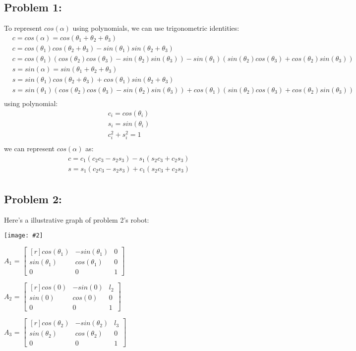 \documentclass[11pt]{article}
\newcommand{\image}[2]{\texttt{[image: \#2]}}
\newcommand{\mat}[1]{
    $\begin{bmatrix*}[r]
        #1
    \end{bmatrix*}$
} %
\newcommand{\myalign}[1]{\begin{align*}#1\end{align*}}
\begin{document}
\subsection{Problem 1:}
To represent $cos(\alpha)$ using  polynomials, we can use trigonometric identities:
\myalign{
    & c = cos(\alpha) = cos(\theta_1 +\theta_2 + \theta_3) \\
    & c = cos(\theta_1)cos(\theta_2+\theta_3)-sin(\theta_1)sin(\theta_2+\theta_3) \\
    & c = cos(\theta_1)(cos(\theta_2)cos(\theta_3)-sin(\theta_2)sin(\theta_3))-sin(\theta_1)(sin(\theta_2)cos(\theta_3)+cos(\theta_2)sin(\theta_3)) \\
    & s = sin(\alpha) = sin(\theta_1 + \theta_2 + \theta_3) \\
    & s = sin(\theta_1)cos(\theta_2+\theta_3)+cos(\theta_1)sin(\theta_2+\theta_3) \\
    & s = sin(\theta_1)(cos(\theta_2)cos(\theta_3)-sin(\theta_2)sin(\theta_3))+cos(\theta_1)(sin(\theta_2)cos(\theta_3)+cos(\theta_2)sin(\theta_3)) \\
}
using polynomial:
\myalign{
    c_i = cos(\theta_i) \\
    s_i = sin(\theta_i) \\
    c_i^2 + s_i^2 = 1 \\
}
we can represent $cos(\alpha)$ as:
\myalign{
    c = c_1(c_2c_3-s_2s_3)-s_1(s_2c_3+c_2s_3) \\
    s = s_1(c_2c_3-s_2s_3)+c_1(s_2c_3+c_2s_3) \\
}
\subsection{Problem 2:}
Here's a illustrative graph of problem 2's robot: \\
\begin{center}
    \image{0.15}{img4}
\end{center}
$A_1$ = \mat{
    cos(\theta_1) & -sin(\theta_1) & 0 \\
    sin(\theta_1) & cos(\theta_1) & 0 \\
    0 & 0 & 1
} 
$A_2$ = \mat{
    cos(0) & -sin(0) & l_2 \\
    sin(0) & cos(0) & 0 \\
    0 & 0 & 1
} 
$A_3$ = \mat{
    cos(\theta_2) & -sin(\theta_2) & l_3 \\
    sin(\theta_2) & cos(\theta_2) & 0 \\
    0 & 0 & 1
} \\
\end{document}
